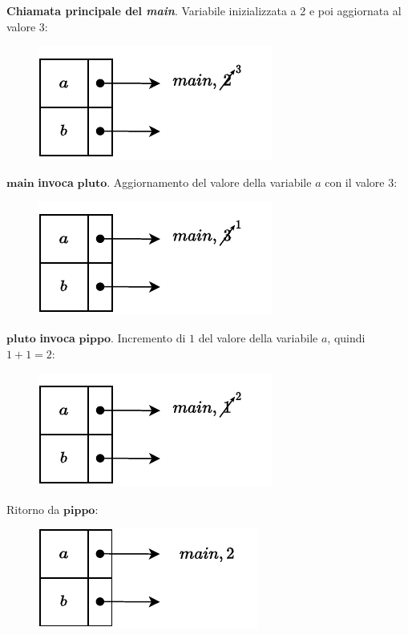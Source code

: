 \documentclass[a4paper]{article}
\begin{document}
	\noindent
	\textbf{Chiamata principale del \emph{main}}. Variabile inizializzata a 2 e poi aggiornata al valore 3:
	\begin{figure}[!htp]
		\centering
		\includegraphics[width=.5\textwidth]{img/ex3-6.pdf}
	\end{figure}
	
	\noindent
	$\mathbf{main}$\textbf{ invoca }$\mathbf{pluto}$. Aggiornamento del valore della variabile $a$ con il valore 3:
	\begin{figure}[!htp]
		\centering
		\includegraphics[width=.5\textwidth]{img/ex3-7.pdf}
	\end{figure}
	
	\noindent
	$\mathbf{pluto}$\textbf{ invoca }$\mathbf{pippo}$. Incremento di $1$ del valore della variabile $a$, quindi $1+1 = 2$:
	\begin{figure}[!htp]
		\centering
		\includegraphics[width=.5\textwidth]{img/ex3-8.pdf}
	\end{figure}
	
	\noindent
	Ritorno da $\mathbf{pippo}$:
	\begin{figure}[!htp]
		\centering
		\includegraphics[width=.5\textwidth]{img/ex3-9.pdf}
	\end{figure}\newpage
	
\end{document}
